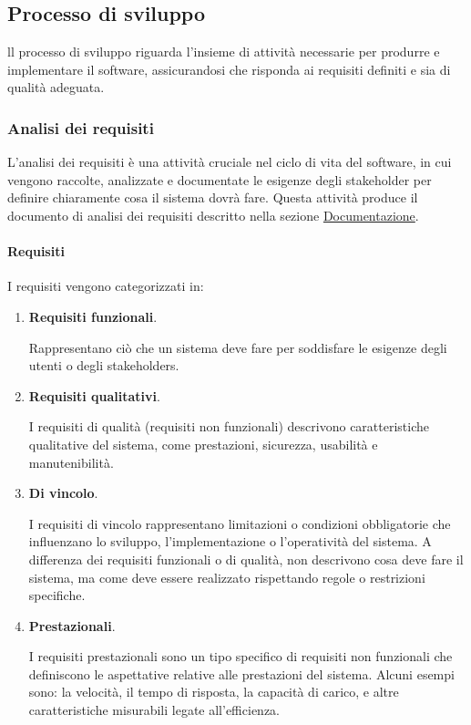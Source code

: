 \subsection{Processo di sviluppo}
\label{subsection:processo_sviluppo}
ll processo di sviluppo riguarda l'insieme di attività necessarie per produrre e implementare il software, assicurandosi che risponda ai requisiti definiti e sia di qualità adeguata.

\subsubsection{Analisi dei requisiti}
L'analisi dei requisiti è una attività cruciale nel ciclo di vita del software, in cui vengono raccolte, analizzate e documentate le esigenze degli stakeholder per definire chiaramente cosa il sistema dovrà fare. 
Questa attività produce il documento di analisi dei requisiti descritto nella sezione \hyperref[subsec:documentazione]{Documentazione}.

\paragraph{Requisiti}
I requisiti vengono categorizzati in:
\begin{enumerate}
    \item \textbf{Requisiti funzionali}.
    
    Rappresentano ciò che un sistema deve fare per soddisfare le esigenze degli utenti o degli stakeholders.

    \item \textbf{Requisiti qualitativi}.
    
    I requisiti di qualità (requisiti non funzionali) descrivono caratteristiche qualitative del sistema, come prestazioni, sicurezza, usabilità e manutenibilità.

    \item \textbf{Di vincolo}.
    
    I requisiti di vincolo rappresentano limitazioni o condizioni obbligatorie che influenzano lo sviluppo, l'implementazione o l'operatività del sistema. 
    A differenza dei requisiti funzionali o di qualità, non descrivono cosa deve fare il sistema, ma come deve essere realizzato rispettando regole o restrizioni specifiche. 

    \item \textbf{Prestazionali}.
    
    I requisiti prestazionali sono un tipo specifico di requisiti non funzionali che definiscono le aspettative relative alle prestazioni del sistema.
    Alcuni esempi sono: la velocità, il tempo di risposta, la capacità di carico, e altre caratteristiche misurabili legate all'efficienza.
\end{enumerate}


